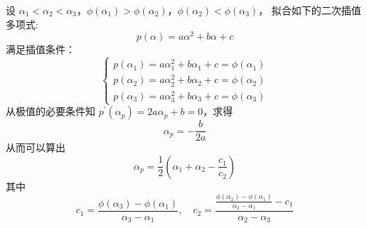 \documentclass[cn,mtpro2,12pt]{elegantbook}
\begin{document}
设 $\alpha_{1}<\alpha_{2}<\alpha_{3}$，$\phi\left(\alpha_{1}\right)>\phi\left(\alpha_{2}\right)$，$\phi\left(\alpha_{2}\right)<\phi\left(\alpha_{3}\right)$， 拟合如下的二次插值多项式:
\begin{equation}
    p(\alpha)=a\alpha^{2}+b\alpha+c
\end{equation}
满足插值条件：
\begin{equation}
    \left\{\begin{array}{l}
        p\left(\alpha_{1}\right)=a\alpha_{1}^{2}+b\alpha_{1}+c=\phi\left(\alpha_{1}\right) \\
        p\left(\alpha_{2}\right)=a\alpha_{2}^{2}+b\alpha_{2}+c=\phi\left(\alpha_{2}\right) \\
        p\left(\alpha_{3}\right)=a\alpha_{3}^{2}+b\alpha_{3}+c=\phi\left(\alpha_{3}\right)
    \end{array}\right.
\end{equation}
从极值的必要条件知 $p^{\prime}(\alpha_{p})=2a\alpha_{p}+b=0$，求得
\begin{equation}
    \alpha_{p}=-\frac{b}{2a}
\end{equation}
从而可以算出
\begin{equation}
    \alpha_{p}=\frac{1}{2}\left(\alpha_{1}+\alpha_{2}-\frac{c_{1}}{c_{2}}\right)
\end{equation}
其中
\begin{equation}
    c_{1}=\frac{\phi\left(\alpha_{3}\right)-\phi\left(\alpha_{1}\right)}{\alpha_{3}-\alpha_{1}},\quad c_{2}=\frac{\frac{\phi\left(\alpha_{2}\right)-\phi\left(\alpha_{1}\right)}{\alpha_{2}-\alpha_{1}}-c_{1}}{\alpha_{2}-\alpha_{3}}
\end{equation}
\end{document}
